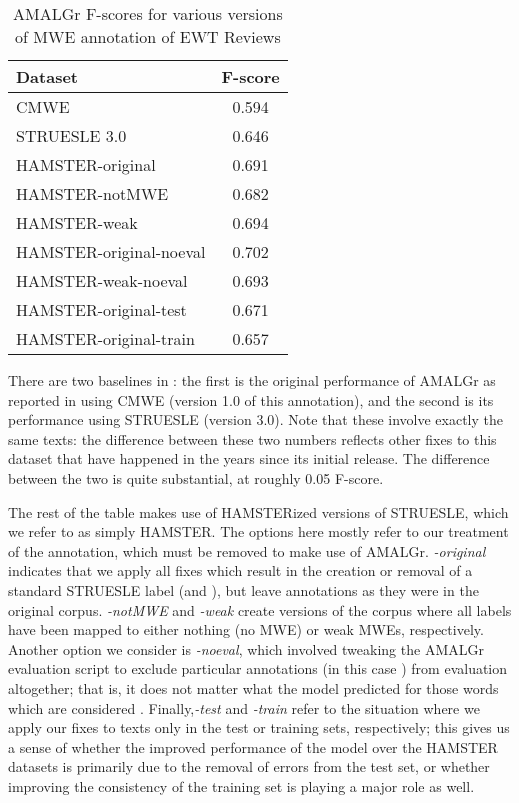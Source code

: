 \documentclass[output=paper
,modfonts
,nonflat]{langsci/langscibook}
\begin{document}
\begin{table*}[t!]
\caption{AMALGr F-scores for various versions of MWE annotation of EWT Reviews} %
\begin{tabular}{l c}
\toprule
\textbf{Dataset}&\textbf{F-score}\\
\midrule
CMWE \citep{Schneider14b} & 0.594\\
STRUESLE 3.0 & 0.646 \\
\midrule
HAMSTER-original & 0.691 \\ 
HAMSTER-notMWE & 0.682 \\
HAMSTER-weak & 0.694 \\
\midrule
HAMSTER-original-noeval & 0.702 \\
HAMSTER-weak-noeval & 0.693\\
\midrule
HAMSTER-original-test & 0.671\\
HAMSTER-original-train  & 0.657 \\

\bottomrule
\end{tabular}%
\label{tab:exp1} %
\end{table*}

There are two baselines in : the first is the original performance of AMALGr as reported in \citet{Schneider14b} using CMWE (version 1.0 of this annotation), and the second is its performance using STRUESLE (version 3.0). Note that these involve exactly the same texts: the difference between these two numbers reflects other fixes to this dataset that have happened in the years since its initial release. The difference between the two is quite substantial, at roughly 0.05 F-score.

The rest of the table makes use of HAMSTERized versions of STRUESLE, which we refer to as simply HAMSTER. The options here mostly refer to our treatment of the \hard annotation, which must be removed to make use of AMALGr. \emph{-original} indicates that we apply all fixes which result in the creation or removal of a standard STRUESLE label (\ie \weak and \strongish), but leave \hard annotations as they were in the original corpus. \emph{-notMWE} and \emph{-weak} create versions of the corpus where all \hard labels have been mapped to either nothing (no MWE) or weak MWEs, respectively. Another option we consider is \emph{-noeval}, which involved tweaking the AMALGr evaluation script to exclude particular annotations (in this case \hard) from evaluation altogether; that is, it does not matter what the model predicted for those words which are considered \hard. Finally,\emph{-test} and \emph{-train} refer to the situation where we apply our fixes to texts only in the test or training sets, respectively; this gives us a sense of whether the improved performance of the model over the HAMSTER datasets is primarily due to the removal of errors from the test set, or whether improving the consistency of the training set is playing a major role as well.
\end{document}
